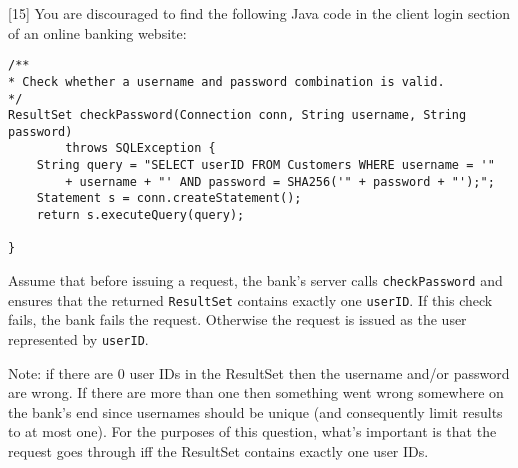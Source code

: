 \documentclass[12pt]{exam}
\newcommand{\solbox}[2]{%
\fbox{%
\parbox[c][#1][t]{\dimexpr\linewidth-2\fboxsep-2\fboxrule}{
  \hrule width \hsize height 0pt
  #2
 }%
}%
\par\vspace{\ht\strutbox}
}
\newcommand{\textfield}[3]{%
\iftoggle{pdfform}{%
\TextField[name = #1, backgroundcolor=white, height=#2,
width = \linewidth, multiline=true]{\mbox}%
}{%
\ifprintanswers\else{%
    \solbox{#2}{#3}}
\fi%
}%
}
\begin{document}
\begin{Form}
\begin{questions}
\newpage

[15]
You are discouraged to find the following Java code in the client login section of an
online banking website:

\begin{verbatim}
/**
* Check whether a username and password combination is valid.
*/
ResultSet checkPassword(Connection conn, String username, String password)
        throws SQLException {
    String query = "SELECT userID FROM Customers WHERE username = '"
        + username + "' AND password = SHA256('" + password + "');";
    Statement s = conn.createStatement();
    return s.executeQuery(query);

}
\end{verbatim}

Assume that before issuing a request, the bank's server calls \texttt{checkPassword} and ensures that the returned \texttt{ResultSet} contains exactly one \texttt{userID}.  
If this check fails, the bank fails the request. Otherwise the request is issued as the user represented by \texttt{userID}.

Note: if there are 0 user IDs in the ResultSet then the username and/or password are
wrong. If there are more than one then something went wrong somewhere on the bank's
end since usernames should be unique (and consequently limit results to at most one).
For the purposes of this question, what’s important is that the request goes through iff
the ResultSet contains exactly one user IDs.

\end{questions}
\end{Form}
\end{document}
